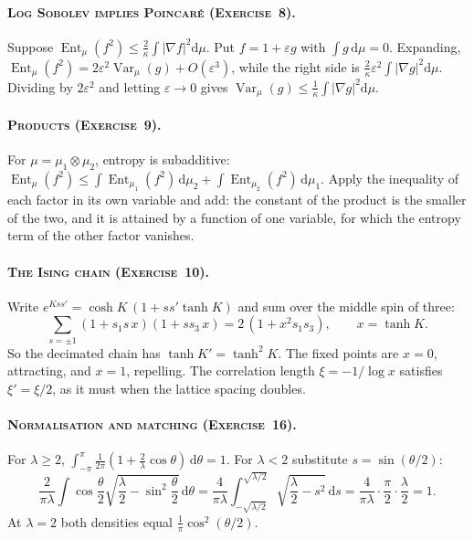 \paragraph{\normalfont\scshape Log Sobolev implies Poincar\'e (Exercise~8).} Suppose $\operatorname{Ent}_\mu(f^2)\le\frac2\kappa\int|\nabla f|^2\mathrm d\mu$. Put $f=1+\varepsilon g$ with $\int g\,\mathrm d\mu=0$. Expanding, $\operatorname{Ent}_\mu(f^2)=2\varepsilon^2\operatorname{Var}_\mu(g)+O(\varepsilon^3)$, while the right side is $\frac2\kappa\varepsilon^2\int|\nabla g|^2\mathrm d\mu$. Dividing by $2\varepsilon^2$ and letting $\varepsilon\to0$ gives $\operatorname{Var}_\mu(g)\le\frac1\kappa\int|\nabla g|^2\mathrm d\mu$.

\paragraph{\normalfont\scshape Products (Exercise~9).} For $\mu=\mu_1\otimes\mu_2$, entropy is subadditive: $\operatorname{Ent}_\mu(f^2)\le\int\operatorname{Ent}_{\mu_1}(f^2)\,\mathrm d\mu_2+\int\operatorname{Ent}_{\mu_2}(f^2)\,\mathrm d\mu_1$. Apply the inequality of each factor in its own variable and add: the constant of the product is the smaller of the two, and it is attained by a function of one variable, for which the entropy term of the other factor vanishes.

\paragraph{\normalfont\scshape The Ising chain (Exercise~10).} Write $e^{Kss'}=\cosh K\,(1+ss'\tanh K)$ and sum over the middle spin of three:
\[
\sum_{s=\pm1}(1+s_1s\,x)(1+ss_3\,x)=2\,(1+x^2s_1s_3),\qquad x=\tanh K.
\]
So the decimated chain has $\tanh K'=\tanh^2K$. The fixed points are $x=0$, attracting, and $x=1$, repelling. The correlation length $\xi=-1/\log x$ satisfies $\xi'=\xi/2$, as it must when the lattice spacing doubles.

\paragraph{\normalfont\scshape Normalisation and matching (Exercise~16).} For $\lambda\ge2$, $\int_{-\pi}^{\pi}\frac{1}{2\pi}(1+\frac2\lambda\cos\theta)\,\mathrm d\theta=1$. For $\lambda<2$ substitute $s=\sin(\theta/2)$:
\[
\frac{2}{\pi\lambda}\int\cos\frac\theta2\sqrt{\frac\lambda2-\sin^2\frac\theta2}\,\mathrm d\theta=\frac{4}{\pi\lambda}\int_{-\sqrt{\lambda/2}}^{\sqrt{\lambda/2}}\sqrt{\frac\lambda2-s^2}\,\mathrm ds=\frac{4}{\pi\lambda}\cdot\frac\pi2\cdot\frac\lambda2=1 .
\]
At $\lambda=2$ both densities equal $\frac1\pi\cos^2(\theta/2)$.

